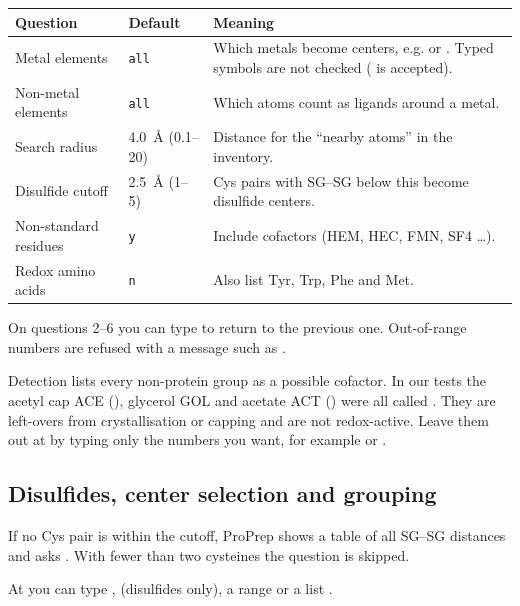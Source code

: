\begin{tabularx}{\linewidth}{@{}lp{2.6cm}L@{}}
\toprule
\textbf{Question} & \textbf{Default} & \textbf{Meaning} \\
\midrule
Metal elements & \texttt{all} & Which metals become centers, e.g. 
  or . Typed symbols are not checked ( is accepted). \\
Non-metal elements & \texttt{all} & Which atoms count as ligands around a
  metal. \\
Search radius & 4.0~\AA{} (0.1--20) & Distance for the ``nearby atoms'' in the
  inventory. \\
Disulfide cutoff & 2.5~\AA{} (1--5) & Cys pairs with SG--SG below this become
  disulfide centers. \\
Non-standard residues & \texttt{y} & Include cofactors (HEM, HEC, FMN, SF4
  \ldots). \\
Redox amino acids & \texttt{n} & Also list Tyr, Trp, Phe and Met. \\
\bottomrule
\end{tabularx}

\medskip
On questions 2--6 you can type  to return to the previous one.
Out-of-range numbers are refused with a message such as
.

\begin{watchout}
Detection lists every non-protein group as a possible cofactor. In our tests
the acetyl cap ACE (), glycerol GOL and acetate ACT
() were all called . They are left-overs
from crystallisation or capping and are not redox-active. Leave them out at
 by typing only the numbers you
want, for example  or .
\end{watchout}

\subsection{Disulfides, center selection and grouping}

If no Cys pair is within the cutoff, ProPrep shows a table of all SG--SG
distances and asks . With fewer than two cysteines the question is skipped.

At  you can type ,
 (disulfides only), a range  or a list
.

